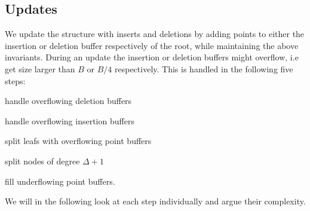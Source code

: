 \documentclass[twoside,11pt,openright]{report}
\begin{document}
\subsection{Updates}
\label{subsec:gerth_updates}
We update the structure with inserts and deletions by adding points to either the insertion or deletion buffer respectively of the root, while maintaining the above invariants.
During an update the insertion or deletion buffers might overflow, i.e get size larger than $B$ or $B/4$ respectively. This is handled in the following five steps:
\begin{inlinelist}
	\item handle overflowing deletion buffers
	\item handle overflowing insertion buffers
	\item split leafs with overflowing point buffers
	\item split nodes of degree $\Delta+1$
	\item fill underflowing point buffers.
\end{inlinelist}

We will in the following look at each step individually and argue their complexity.
\end{document}
